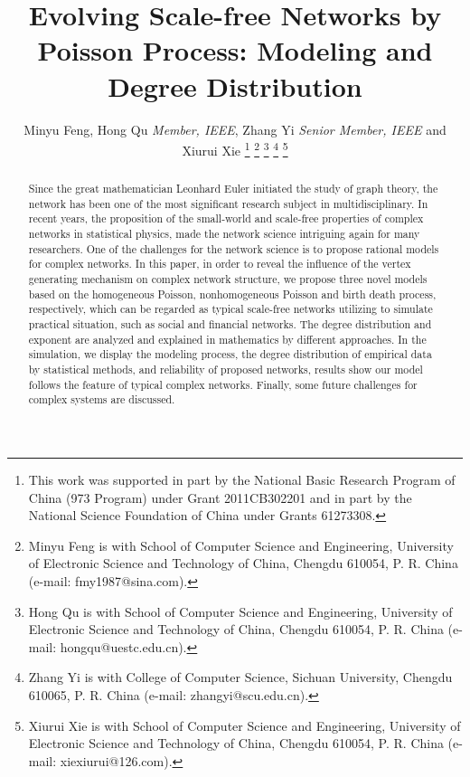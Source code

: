 \documentclass[final]{IEEEtran}
\begin{document}
\title{Evolving Scale-free Networks by Poisson Process: Modeling and Degree Distribution}

\author{Minyu Feng,  Hong Qu {\em Member, IEEE}, Zhang Yi {\em Senior Member,
IEEE} and Xiurui Xie
\thanks{This work was supported in part by the National Basic Research Program of China (973 Program) under Grant 2011CB302201 and in part by the National Science Foundation of China under Grants 61273308.
}
\thanks{Minyu Feng is with School
of Computer Science and Engineering, University of Electronic
Science and Technology of China, Chengdu 610054, P. R. China
(e-mail: fmy1987@sina.com). }
\thanks{Hong Qu is with School
of Computer Science and Engineering, University of Electronic
Science and Technology of China, Chengdu 610054, P. R. China
(e-mail: hongqu@uestc.edu.cn).}
\thanks{Zhang Yi is with College of Computer Science, Sichuan
University, Chengdu 610065, P. R. China (e-mail:
zhangyi@scu.edu.cn).}
\thanks{Xiurui Xie is with School
of Computer Science and Engineering, University of Electronic
Science and Technology of China, Chengdu 610054, P. R. China
(e-mail: xiexiurui@126.com). } }


\maketitle \thispagestyle{plain}\pagestyle{plain}



\begin{abstract}
Since the great mathematician Leonhard Euler initiated the study
of graph theory, the network has been one of the most significant
research subject in multidisciplinary. In recent years, the
proposition of the small-world and scale-free properties of
complex networks in statistical physics, made the network science
intriguing again for many researchers. One of the challenges for
the network science is to propose rational models for complex
networks. In this paper, in order to reveal the influence of the
vertex generating mechanism on complex network structure, we
propose three novel models based on the homogeneous Poisson,
nonhomogeneous Poisson and birth death process, respectively,
which can be regarded as typical scale-free networks utilizing to
simulate practical situation, such as social and financial
networks. The degree distribution and exponent are analyzed and
explained in mathematics by different approaches. In the
simulation, we display the modeling process, the degree
distribution of empirical data by statistical methods, and
reliability of proposed networks, results show our model follows
the feature of typical complex networks. Finally, some future
challenges for complex systems are discussed.
\end{abstract}
\end{document}
